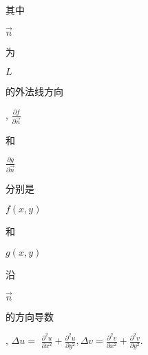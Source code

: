 \documentclass[10pt]{article}
\begin{document}
\begin{CJK}{UTF8}{mj}其中\end{CJK} $\vec{n}$ \begin{CJK}{UTF8}{mj}为\end{CJK} $L$ \begin{CJK}{UTF8}{mj}的外法线方向\end{CJK}, $\frac{\partial f}{\partial \vec{n}}$ \begin{CJK}{UTF8}{mj}和\end{CJK} $\frac{\partial g}{\partial \vec{n}}$ \begin{CJK}{UTF8}{mj}分别是\end{CJK} $f(x, y)$ \begin{CJK}{UTF8}{mj}和\end{CJK} $g(x, y)$ \begin{CJK}{UTF8}{mj}沿\end{CJK} $\vec{n}$ \begin{CJK}{UTF8}{mj}的方向导数\end{CJK}, $\Delta u=$ $\frac{\partial^{2} u}{\partial x^{2}}+\frac{\partial^{2} u}{\partial y^{2}}, \Delta v=\frac{\partial^{2} v}{\partial x^{2}}+\frac{\partial^{2} v}{\partial y^{2}} .$
\end{document}
